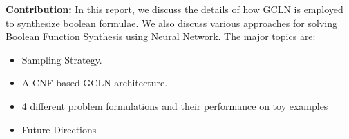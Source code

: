 \smallskip
\noindent\textbf{Contribution: } In this report, we discuss the details of how GCLN is employed to synthesize boolean formulae. We also discuss various approaches for solving Boolean Function Synthesis using Neural Network. The major topics are:
\begin{itemize}
\item  Sampling Strategy.
\item  A CNF based GCLN architecture.
\item  4 different problem formulations and their performance on toy examples
\item  Future Directions
\end{itemize}